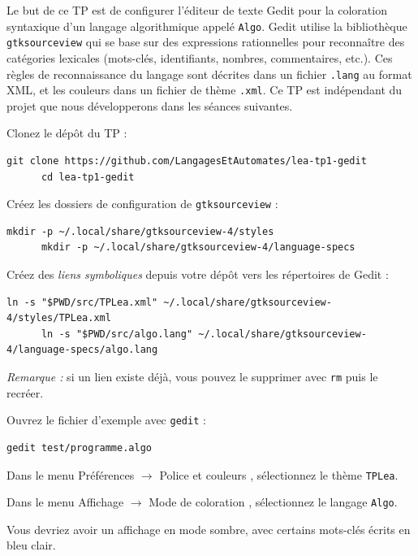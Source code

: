\documentclass{td}
\begin{document}



Le but de ce TP est de configurer l'éditeur de texte Gedit pour 
la coloration syntaxique d'un langage algorithmique appelé \texttt{Algo}.
Gedit utilise la bibliothèque \texttt{gtksourceview}
qui se base sur des expressions rationnelles pour reconnaître des catégories lexicales
(mots-clés, identifiants, nombres, commentaires, etc.).
Ces règles de reconnaissance du langage sont décrites dans un fichier \texttt{.lang} au format XML,
et les couleurs dans un fichier de thème \texttt{.xml}.
Ce TP est indépendant du projet que nous développerons dans les séances suivantes.

\begin{exercice}

  \begin{questions}
  \item Clonez le dépôt du TP :
    \begin{lstlisting}[gobble=6]
      git clone https://github.com/LangagesEtAutomates/lea-tp1-gedit
      cd lea-tp1-gedit
    \end{lstlisting}

  \item Créez les dossiers de configuration de \texttt{gtksourceview} :
    \begin{lstlisting}[gobble=6]
      mkdir -p ~/.local/share/gtksourceview-4/styles
      mkdir -p ~/.local/share/gtksourceview-4/language-specs
    \end{lstlisting}

  \item Créez des \emph{liens symboliques} depuis votre dépôt vers les répertoires de Gedit :
    \begin{lstlisting}[gobble=6]
      ln -s "$PWD/src/TPLea.xml" ~/.local/share/gtksourceview-4/styles/TPLea.xml
      ln -s "$PWD/src/algo.lang" ~/.local/share/gtksourceview-4/language-specs/algo.lang
    \end{lstlisting}

    \emph{Remarque :} si un lien existe déjà, vous pouvez le supprimer avec \lstinline|rm| puis le recréer.

  \item Ouvrez le fichier d'exemple avec \lstinline{gedit} :
    \begin{lstlisting}[gobble=6]
      gedit test/programme.algo
    \end{lstlisting}

  \item Dans le menu \og Préférences $\rightarrow$ Police et couleurs \fg, sélectionnez le thème \lstinline{TPLea}.

  \item Dans le menu \og Affichage $\rightarrow$ Mode de coloration \fg, sélectionnez le langage \lstinline{Algo}.
  \end{questions}

  Vous devriez avoir un affichage en mode sombre, avec certains mots-clés écrits en bleu clair.
\end{exercice}
\end{document}

